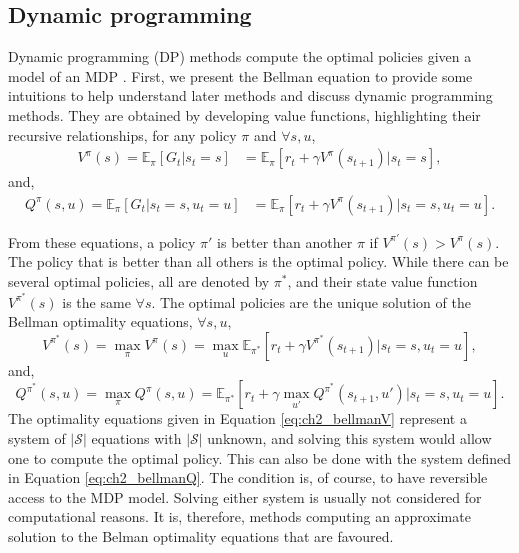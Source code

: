 \subsection{Dynamic programming}
Dynamic programming (DP) \citep{bellman1966dynamic} methods compute the optimal policies given a model of an MDP \citep{sutton2018reinforcement}.
First, we present the Bellman equation to provide some intuitions to help understand later methods and discuss dynamic programming methods.
They are obtained by developing value functions, highlighting their recursive relationships, for any policy $\pi$ and $\forall s, u$,
\begin{equation}
\label{eq:ch2_V_2}
\begin{split}
    V^\pi(s)= \mathbb{E}_{\pi}\left[G_t|s_t=s\right] & = \mathbb{E}_{\pi}\left[r_t + \gamma V^\pi(s_{t+1})|s_t=s\right],
\end{split}
\end{equation}
and,
\begin{equation}
\label{eq:ch2_Q_2}
\begin{split}
    Q^\pi(s, u) = \mathbb{E}_{\pi}\left[G_t|s_t=s, u_t=u\right] & = \mathbb{E}_{\pi}\left[r_t + \gamma V^\pi(s_{t+1})|s_t=s, u_t=u \right].
\end{split}
\end{equation}

From these equations, a policy $\pi'$ is better than another $\pi$ if $V^{\pi'}(s)>V^\pi(s)$.
The policy that is better than all others is the optimal policy.
While there can be several optimal policies, all are denoted by $\pi^*$, and their state value function $V^{\pi^*}(s)$ is the same $\forall s$.
The optimal policies are the unique solution of the Bellman optimality equations, $\forall s, u$,
\begin{equation}
\label{eq:ch2_bellmanV}
    V^{\pi^*}(s) = \max_{\pi}V^\pi(s) = \max_u \mathbb{E}_{\pi^*}[r_t + \gamma V^{\pi^*}(s_{t+1})| s_t=s, u_t=u],
\end{equation}
and,
\begin{equation}
\label{eq:ch2_bellmanQ}
    Q^{\pi^*}(s, u) =  \max_{\pi}Q^\pi(s, u) = \mathbb{E}_{\pi^*}[r_t + \gamma \max_{u'} Q^{\pi^*}(s_{t+1}, u') |s_t=s, u_t=u].
\end{equation}
The optimality equations given in Equation \ref{eq:ch2_bellmanV} represent a system of $|\mathcal{S}|$ equations with $|\mathcal{S}|$ unknown, and solving this system would allow one to compute the optimal policy.
This can also be done with the system defined in Equation \ref{eq:ch2_bellmanQ}.
The condition is, of course, to have reversible access to the MDP model.
Solving either system is usually not considered for computational reasons.
It is, therefore, methods computing an approximate solution to the Belman optimality equations that are favoured.

